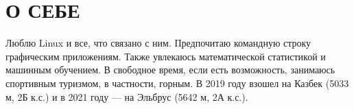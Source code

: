 \section{О СЕБЕ}

    Люблю Linux и все, что связано с ним. Предпочитаю командную строку графическим приложениям.
    Также увлекаюсь математической статистикой и машинным обучением.
    В свободное время, если есть возможность, занимаюсь спортивным туризмом, в частности, горным. В 2019 году
    взошел на Казбек (5033 м, 2Б к.с.) и в 2021 году — на Эльбрус (5642 м, 2А к.с.).
